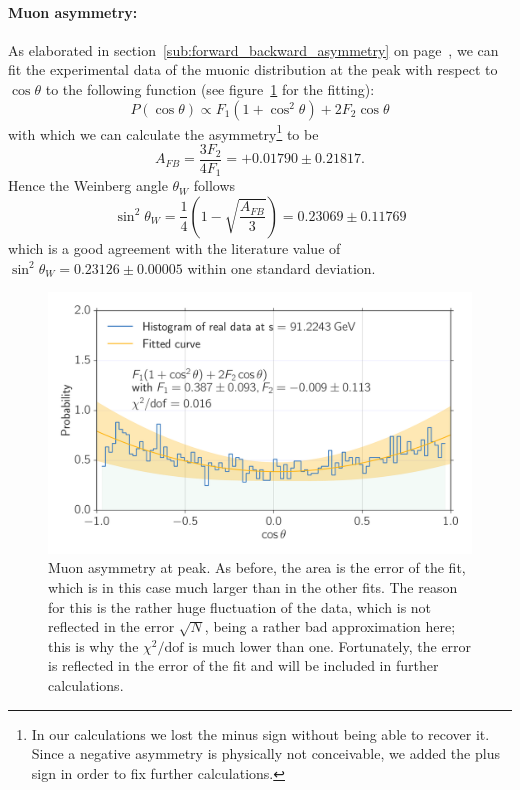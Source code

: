 \paragraph{\textbf{Muon asymmetry:}}
\label{par:assymetry}
As elaborated in section~\ref{sub:forward_backward_asymmetry} on page~\pageref{sub:forward_backward_asymmetry},
we can fit the experimental data of the muonic distribution at the peak with respect to $\cos\theta$ to the following function
(see figure~\ref{fig:assymetry} for the fitting):
\begin{equation}
P(\cos\theta) \propto F_1 ( 1+ \cos^2\theta) + 2 F_2 \cos\theta
\end{equation}
with which we can calculate the asymmetry\footnote{In our calculations we lost the minus sign without being
    able to recover it. Since a negative
asymmetry is physically not conceivable, we added the plus sign in order to fix further calculations.} to be
\begin{equation}
    A_{FB} = \frac{3 F_2}{4 F_1} = +0.01790 \pm 0.21817.
\end{equation}
Hence the Weinberg angle $\theta_W$ follows
\begin{equation}
    \sin^2 \theta_W = \frac{1}{4} \left( 1 - \sqrt{ \frac{A_{FB}}{3}} \right)  = 0.23069 \pm 0.11769
\end{equation}
which is a good agreement with the literature value \cite{pdg} of $\sin^2 \theta_W = 0.23126 \pm 0.00005$ within
one standard deviation.


\begin{figure}[htpb]
    \centering
    \includegraphics[width=1.0\linewidth]{figures/assymetry}
    \caption{Muon asymmetry at peak. As before, the area is the error of the fit, which is in this case much larger than in
    the other fits. The reason for this is the rather huge fluctuation of the data, which is not reflected in the error 
    $\sqrt{N}$, being a rather bad approximation here; this is why the $\chi^2 / \mathrm{dof}$ is much lower than one.
    Fortunately, the error is reflected in the error of the fit and will be included in further calculations.
}
    \label{fig:assymetry}
\end{figure}

